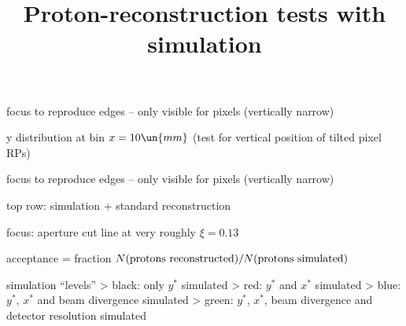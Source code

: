 \> focus to reproduce edges -- only visible for pixels (vertically narrow)

\centerline{}



\newpage %

\SmallerFonts

\> y distribution at bin $x = 10\un{mm}$ (test for vertical position of tilted pixel RPs)

\> focus to reproduce edges -- only visible for pixels (vertically narrow)

\centerline{}



\newpage %

\centerline{}



\newpage %

\SmallerFonts

\> top row: simulation + standard reconstruction

\> focus: aperture cut line at very roughly $\xi = 0.13$

\centerline{}


\newpage %

\> acceptance = fraction $N(\hbox{protons reconstructed}) / N(\hbox{protons simulated})$

\centerline{}



\newpage %
\title{Proton-reconstruction tests with simulation}

\> simulation ``levels''
\>> black: only $y^*$ simulated
\>> red: $y^*$ and $x^*$ simulated
\>> blue: $y^*$, $x^*$ and beam divergence simulated
\>> green: $y^*$, $x^*$, beam divergence and detector resolution simulated

